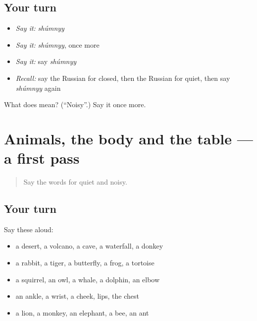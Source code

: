 \subsection*{Your turn}
\begin{itemize}
\raggedright
  \item \emph{Say it:} \emph{shúmnyy}
  \item \emph{Say it:} \emph{shúmnyy}, once more
  \item \emph{Say it:} say \emph{shúmnyy}
  \item \emph{Recall:} say the Russian for closed, then the Russian for quiet, then say \emph{shúmnyy} again
\end{itemize}

\begin{tcolorbox}[breakable,colback=teal!4,colframe=teal!35!black,title={Before you move on}]
What does  mean? (\textquotedblleft{}Noisy\textquotedblright{}.) Say it once more.
\end{tcolorbox}
\section[(dialogue)]{Animals, the body and the table — a first pass}

\label{lesson:RU-R125-first-pass-animals-the-body-and-the-table}



\begin{quote}
Say the words for quiet and noisy.
\end{quote}

\subsection*{Your turn}
Say these aloud:

\begin{itemize}
\raggedright
  \item a desert, a volcano, a cave, a waterfall, a donkey
  \item a rabbit, a tiger, a butterfly, a frog, a tortoise
  \item a squirrel, an owl, a whale, a dolphin, an elbow
  \item an ankle, a wrist, a cheek, lips, the chest
  \item a lion, a monkey, an elephant, a bee, an ant
\end{itemize}

